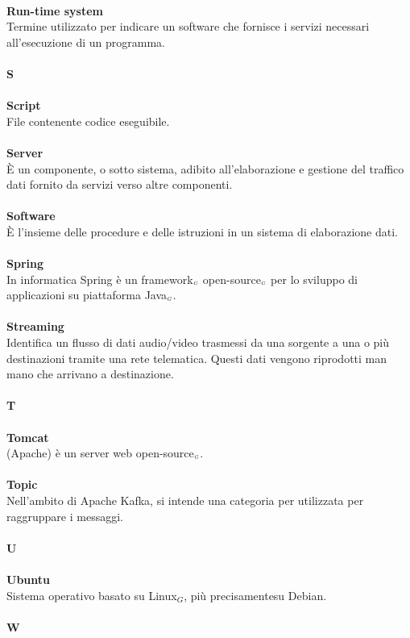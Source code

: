 \\
\textbf{Run-time system}\\
Termine utilizzato per indicare un software che fornisce i servizi necessari all'esecuzione di un programma.\\
\\
\textbf{S}\\
\\
\textbf{Script}\\
File contenente codice eseguibile.\\
\\
\textbf{Server}\\
È un componente, o sotto sistema, adibito all'elaborazione e gestione del traffico dati fornito da servizi verso altre componenti.\\
\\
\textbf{Software}\\
È l'insieme delle procedure e delle istruzioni in un sistema di elaborazione dati.\\
\\
\textbf{Spring}\\
In informatica Spring è un framework$_{\scaleto{G}{3pt}}$ open-source$_{\scaleto{G}{3pt}}$ per lo sviluppo di applicazioni su piattaforma Java$_{\scaleto{G}{3pt}}$.\\
\\
\textbf{Streaming}\\
Identifica un flusso di dati audio/video trasmessi da una sorgente a una o più destinazioni tramite una rete telematica. Questi dati vengono riprodotti man mano che arrivano a destinazione.\\
\\
\textbf{T}\\
\\
\textbf{Tomcat}\\
(Apache) è un server web open-source$_{\scaleto{G}{3pt}}$.\\
\\
\textbf{Topic}\\
Nell'ambito di Apache Kafka, si intende una categoria per utilizzata per raggruppare i messaggi.\\
\\
\textbf{U}\\
\\
\textbf{Ubuntu}\\
Sistema operativo basato su Linux$_G$, più precisamentesu Debian.\\
\\
\textbf{W}\\
